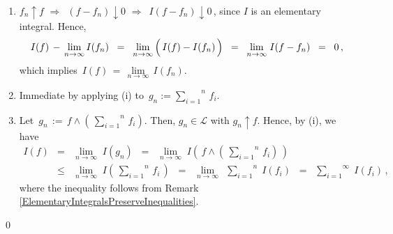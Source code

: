 \begin{enumerate}
\item
	$f_{n} \uparrow f$
	\;\;$\Longrightarrow$\,\; $(f - f_{n}) \downarrow 0$
	\;\;$\Longrightarrow$\,\; $I(f - f_{n}) \downarrow 0$\,,
	since $I$ is an elementary integral.
	Hence,
	\begin{equation*}
	I(f) \,- \,\underset{n\rightarrow\infty}{\lim}\,I(f_{n})
	\;\; = \;\;
		\underset{n\rightarrow\infty}{\lim} \left(\, I(f) \overset{{\color{white}.}}{-} I(f_{n}) \,\right)
	\;\; = \;\;
		\underset{n\rightarrow\infty}{\lim}\;I(f \overset{{\color{white}.}}{-} f_{n})
	\;\; = \;\;
		0\,,
	\end{equation*}
	which implies \,$I(f) \,=\,\underset{n\rightarrow\infty}{\lim}\,I(f_{n})$.
\item
	Immediate by applying (i) to \,$g_{n} := \overset{n}{\underset{i=1}{\sum}}\,f_{i}$.
\item
	Let \,$g_{n} \,:=\, f \wedge \left(\,\overset{n}{\underset{i=1}{\sum}}\,f_{i}\right)$.
	Then, $g_{n} \in \mathcal{L}$ with $g_{n} \uparrow f$.
	Hence, by (i), we have
	\begin{eqnarray*}
	I(f)
	&=&
		\underset{n\rightarrow\infty}{\lim}\;I(g_{n})
	\;\; = \;\;
		\underset{n\rightarrow\infty}{\lim}\;I\!\left(\,f \wedge \left(\,\overset{n}{\underset{i=1}{\sum}}\,f_{i}\right)\,\right)
	\\
	&\leq&
		\underset{n\rightarrow\infty}{\lim}\;I\!\left(\,\overset{n}{\underset{i=1}{\sum}}\,f_{i}\,\right)
	\;\; = \;\;
		\underset{n\rightarrow\infty}{\lim}\;\,\overset{n}{\underset{i=1}{\sum}}\;I(f_{i})
	\;\; = \;\;
		\overset{\infty}{\underset{i=1}{\sum}}\;I(f_{i})\,,
	\end{eqnarray*}
	where the inequality follows from Remark \ref{ElementaryIntegralsPreserveInequalities}.
\end{enumerate}
\qed



\renewcommand{\theenumi}{\roman{enumi}}
\renewcommand{\labelenumi}{\textnormal{(\theenumi)}$\;\;$}

